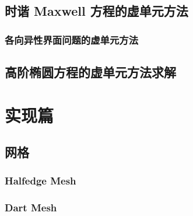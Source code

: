 \documentclass[aspectratio=169,serif]{beamer}
\begin{document}
\subsection{时谐 Maxwell 方程的虚单元方法}

\subsubsection{各向异性界面问题的虚单元方法}

\subsection{高阶椭圆方程的虚单元方法求解}

\section{实现篇}
\subsection{网格}
\begin{frame}    
    \frametitle{Halfedge Mesh}
\end{frame}

\begin{frame}    
    \frametitle{Dart Mesh}
\end{frame}
\end{document}
